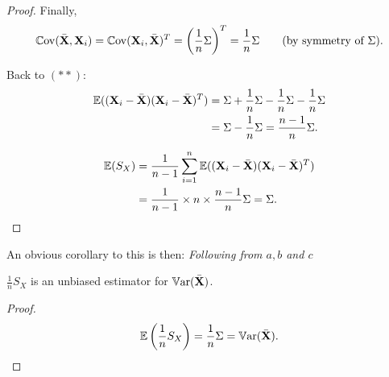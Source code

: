 \documentclass[10pt, a4paper]{article}
\begin{document}
\begin{proposition}[c]
\begin{proof}
        Finally,
        \[
        \mathbb{C}\mathrm{ov}(\bar{\mathbf{X}}, \mathbf{X}_i) = \mathbb{C}\mathrm{ov}(\mathbf{X}_i, \bar{\mathbf{X}}) ^ T = \left(\frac{1}{n}\Sigma\right) ^ T = \frac{1}{n}\Sigma\qquad\text{(by symmetry of $\Sigma$)}.
        \]

        Back to $(**)$:
        \begin{align*}
            \mathbb{E}((\mathbf{X}_i - \bar{\mathbf{X}})(\mathbf{X}_i - \bar{\mathbf{X}}) ^ T) &= \Sigma + \frac{1}{n}\Sigma - \frac{1}{n}\Sigma - \frac{1}{n}\Sigma \\
            &= \Sigma - \frac{1}{n}\Sigma = \frac{n - 1}{n}\Sigma.
        \end{align*}
        
        \begin{align*}
            \mathbb{E}(S_X) &= \frac{1}{n - 1}\sum_{i = 1}^{n}\mathbb{E}((\mathbf{X}_i - \bar{\mathbf{X}})(\mathbf{X}_i - \bar{\mathbf{X}}) ^ T) \\
            &= \frac{1}{n - 1}\times n \times \frac{n - 1}{n}\Sigma = \Sigma.
        \end{align*}
    \end{proof}
\end{proposition}

An obvious corollary to this is then:
\textit{Following from $a, b$ and $c$}
\begin{proposition}[d]
    $\frac{1}{n}S_{X}$ is an unbiased estimator for $\mathbb{V}\mathrm{ar}(\bar{\mathbf{X}})$.

    \begin{proof}
        \[
        \mathbb{E}\left(\frac{1}{n}S_{X}\right) = \frac{1}{n}\Sigma = \mathbb{V}\mathrm{ar}(\bar{\mathbf{X}}).
        \]
    \end{proof}
\end{proposition}
\end{document}
